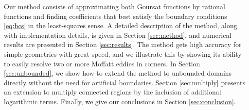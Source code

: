 Our method consists of approximating both Goursat functions by rational functions and finding coefficients that best satisfy the boundary conditions \eqref{eq:bcs} in the least-squares sense. A detailed description of the method, along with implementation details, is given in Section \ref{sec:method}, and numerical results are presented in Section \ref{sec:results}. The method gets high accuracy for simple geometries with great speed, and we illustrate this by showing its ability to easily resolve two or more Moffatt eddies in corners. In Section \ref{sec:unbounded}, we show how to extend the method to unbounded domains directly without the need for artificial boundaries. Section  \ref{sec:multiply} presents an extension to multiply connected regions by the inclusion of additional logarithmic terms. Finally, we give our
conclusions in Section \ref{sec:conclusion}.